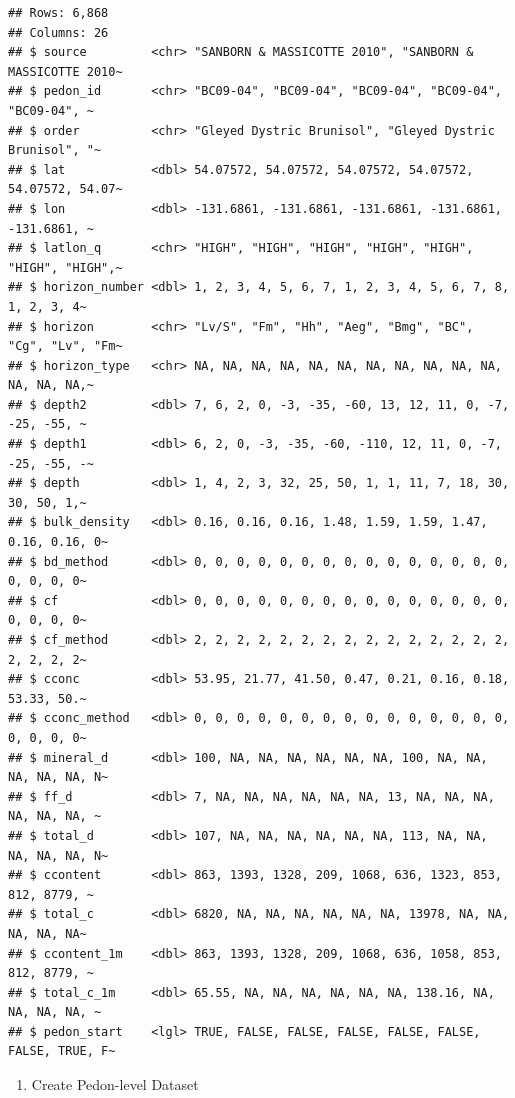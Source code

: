 \documentclass[
]{article}
\providecommand{\tightlist}{%
  \setlength{\itemsep}{0pt}\setlength{\parskip}{0pt}}
\begin{document}
\begin{verbatim}
## Rows: 6,868
## Columns: 26
## $ source         <chr> "SANBORN & MASSICOTTE 2010", "SANBORN & MASSICOTTE 2010~
## $ pedon_id       <chr> "BC09-04", "BC09-04", "BC09-04", "BC09-04", "BC09-04", ~
## $ order          <chr> "Gleyed Dystric Brunisol", "Gleyed Dystric Brunisol", "~
## $ lat            <dbl> 54.07572, 54.07572, 54.07572, 54.07572, 54.07572, 54.07~
## $ lon            <dbl> -131.6861, -131.6861, -131.6861, -131.6861, -131.6861, ~
## $ latlon_q       <chr> "HIGH", "HIGH", "HIGH", "HIGH", "HIGH", "HIGH", "HIGH",~
## $ horizon_number <dbl> 1, 2, 3, 4, 5, 6, 7, 1, 2, 3, 4, 5, 6, 7, 8, 1, 2, 3, 4~
## $ horizon        <chr> "Lv/S", "Fm", "Hh", "Aeg", "Bmg", "BC", "Cg", "Lv", "Fm~
## $ horizon_type   <chr> NA, NA, NA, NA, NA, NA, NA, NA, NA, NA, NA, NA, NA, NA,~
## $ depth2         <dbl> 7, 6, 2, 0, -3, -35, -60, 13, 12, 11, 0, -7, -25, -55, ~
## $ depth1         <dbl> 6, 2, 0, -3, -35, -60, -110, 12, 11, 0, -7, -25, -55, -~
## $ depth          <dbl> 1, 4, 2, 3, 32, 25, 50, 1, 1, 11, 7, 18, 30, 30, 50, 1,~
## $ bulk_density   <dbl> 0.16, 0.16, 0.16, 1.48, 1.59, 1.59, 1.47, 0.16, 0.16, 0~
## $ bd_method      <dbl> 0, 0, 0, 0, 0, 0, 0, 0, 0, 0, 0, 0, 0, 0, 0, 0, 0, 0, 0~
## $ cf             <dbl> 0, 0, 0, 0, 0, 0, 0, 0, 0, 0, 0, 0, 0, 0, 0, 0, 0, 0, 0~
## $ cf_method      <dbl> 2, 2, 2, 2, 2, 2, 2, 2, 2, 2, 2, 2, 2, 2, 2, 2, 2, 2, 2~
## $ cconc          <dbl> 53.95, 21.77, 41.50, 0.47, 0.21, 0.16, 0.18, 53.33, 50.~
## $ cconc_method   <dbl> 0, 0, 0, 0, 0, 0, 0, 0, 0, 0, 0, 0, 0, 0, 0, 0, 0, 0, 0~
## $ mineral_d      <dbl> 100, NA, NA, NA, NA, NA, NA, 100, NA, NA, NA, NA, NA, N~
## $ ff_d           <dbl> 7, NA, NA, NA, NA, NA, NA, 13, NA, NA, NA, NA, NA, NA, ~
## $ total_d        <dbl> 107, NA, NA, NA, NA, NA, NA, 113, NA, NA, NA, NA, NA, N~
## $ ccontent       <dbl> 863, 1393, 1328, 209, 1068, 636, 1323, 853, 812, 8779, ~
## $ total_c        <dbl> 6820, NA, NA, NA, NA, NA, NA, 13978, NA, NA, NA, NA, NA~
## $ ccontent_1m    <dbl> 863, 1393, 1328, 209, 1068, 636, 1058, 853, 812, 8779, ~
## $ total_c_1m     <dbl> 65.55, NA, NA, NA, NA, NA, NA, 138.16, NA, NA, NA, NA, ~
## $ pedon_start    <lgl> TRUE, FALSE, FALSE, FALSE, FALSE, FALSE, FALSE, TRUE, F~
\end{verbatim}

\begin{enumerate}
\def\labelenumi{\arabic{enumi}.}
\setcounter{enumi}{1}
\tightlist
\item
  Create Pedon-level Dataset
\end{enumerate}
\end{document}
